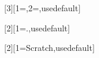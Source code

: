 [3][1=\relax,2={},usedefault]{%
    }



%
%
%
%

[2][1={.},usedefault]{
}

\newcommand*{\draftnote}[1]{%
    \pseudotodo{#1}
}

\newcommand*{\guidance}[1]{%
    \pseudotodo[black!050]{\textsc{#1}}
}

\newcommand*{\outline}[1]{%
    \pseudotodo[blue!080]{#1}
}





%
%
\newcommand{\gib}{\gibi\byte}
\newcommand{\mib}{\mebi\byte}
\newcommand{\kib}{\kibi\byte}



%
%
%

\newlength{\intomarginwidth}
\addtolength{\intomarginwidth}{\linewidth}
\addtolength{\intomarginwidth}{\marginparsep}
\addtolength{\intomarginwidth}{\marginparwidth}

[2][1={Scratch},usedefault]{%
}



